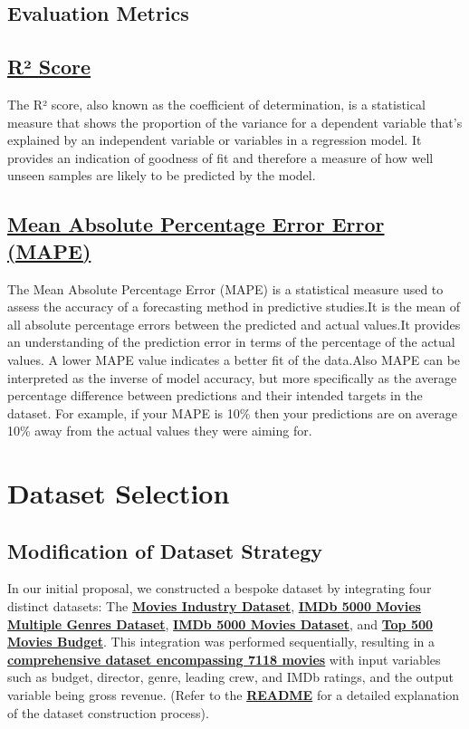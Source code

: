 \documentclass[conference]{IEEEtran}
\begin{document}
    \subsection*{Evaluation Metrics}

    \subsection*{\href{https://en.wikipedia.org/wiki/Coefficient_of_determination}{R² Score}}
        The R² score, also known as the coefficient of determination, is a statistical measure that shows the proportion of the variance for a dependent variable that's explained by an independent variable or variables in a regression model. It provides an indication of goodness of fit and therefore a measure of how well unseen samples are likely to be predicted by the model.

    \subsection*{\href{https://stephenallwright.com/interpret-mape/}{Mean Absolute Percentage Error Error (MAPE)}}
        The Mean Absolute Percentage Error (MAPE) is a statistical measure used to assess the accuracy of a forecasting method in predictive studies.It is the mean of all absolute percentage errors between the predicted and actual values.It provides an understanding of the prediction error in terms of the percentage of the actual values. A lower MAPE value indicates a better fit of the data.Also MAPE can be interpreted as the inverse of model accuracy, but more specifically as the average percentage difference between predictions and their intended targets in the dataset. For example, if your MAPE is 10\% then your predictions are on average 10\% away from the actual values they were aiming for.

\section{Dataset Selection}
     \subsection{Modification of Dataset Strategy}
        In our initial proposal, we constructed a bespoke dataset by integrating four distinct datasets: The \href{https://www.kaggle.com/datasets/danielgrijalvas/movies}{\textbf{Movies Industry Dataset}}, \href{https://www.kaggle.com/datasets/rakkesharv/imdb-5000-movies-multiple-genres-dataset}{\textbf{IMDb 5000 Movies Multiple Genres Dataset}}, \href{https://www.kaggle.com/datasets/carolzhangdc/imdb-5000-movie-dataset}{\textbf{IMDb 5000 Movies Dataset}}, and \href{https://www.kaggle.com/datasets/mitchellharrison/top-500-movies-budget}{\textbf{Top 500 Movies Budget}}. This integration was performed sequentially, resulting in a \href{../../../../data/processed/output.csv}{\textbf{comprehensive dataset encompassing 7118 movies}} with input variables such as budget, director, genre, leading crew, and IMDb ratings, and the output variable being gross revenue. (Refer to the \href{../../../../data/README.md}{\textbf{README}} for a detailed explanation of the dataset construction process).
\end{document}
